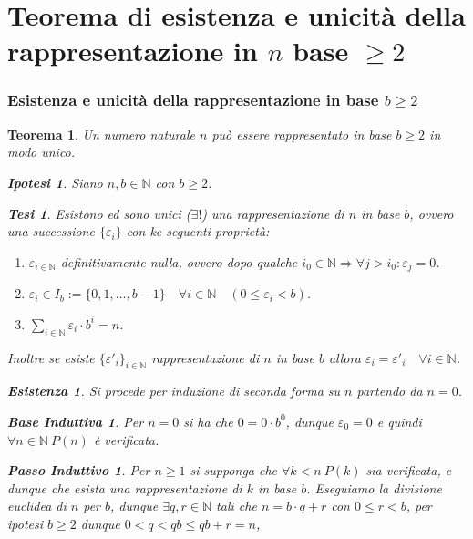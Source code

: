 \documentclass{article}
\makeatletter
\renewenvironment{proof}[1][\proofname]{\par
    \pushQED{\qed}%
    \normalfont \topsep6\p@\@plus6\p@\relax
    \trivlist
    \item\relax
    {\itshape
    #1\@addpunct{.}}\hspace\labelsep\ignorespaces
    }{%
    \popQED\endtrivlist\@endpefalse
}
\newtheorem{theorem}{Teorema}[part]
\newtheorem{ipothesis}[lemma]{Ipotesi}
\newtheorem{thesis}[lemma]{Tesi}
\newtheorem*{existence}{Esistenza}
\newtheorem*{base}{Base Induttiva}
\newtheorem*{step}{Passo Induttivo}
\makeatother
\begin{document}
\part{Teorema di esistenza e unicità della rappresentazione in \(n\) base \(\ge 2\)}
\section{Esistenza e unicità della rappresentazione in base \(b\ge 2\)}
\begin{theorem}
    Un numero naturale \(n\) può essere rappresentato in base \(b\ge 2\) in modo unico.
    \begin{ipothesis}
        Siano \(n,b\in\mathbb{N}\) con \(b\ge 2\).
    \end{ipothesis}
    \begin{thesis}
        Esistono ed sono unici (\(\exists!\)) una rappresentazione di \(n\) in base \(b\), ovvero una successione \(\{\varepsilon_i\}\) con ke seguenti proprietà:
        \begin{enumerate}
            \item \(\varepsilon_{i\in\mathbb{N}}\) definitivamente nulla, ovvero dopo qualche \(i_0\in\mathbb{N}\Rightarrow \forall j>i_0: \varepsilon_j=0\).
            \item \(\varepsilon_i\in I_b:=\{0,1,\ldots,b-1\}\quad \forall i\in\mathbb{N}\quad (0\leq\varepsilon_i< b)\).
            \item \(\displaystyle\sum_{i\in\mathbb{N}} \varepsilon_i\cdot b^i=n\).
        \end{enumerate}
        Inoltre se esiste \(\{\varepsilon'_i\}_{i\in\mathbb{N}}\) rappresentazione di \(n\) in base \(b\) allora \(\varepsilon_i=\varepsilon'_i\quad \forall i\in\mathbb{N}\).
    \end{thesis}
    \begin{proof}
        \begin{existence}
            Si procede per induzione di seconda forma su \(n\) partendo da \(n=0\).
            \begin{base} Per \(n=0\) si ha che \(0=0\cdot b^0\), dunque \(\varepsilon_0=0\) e quindi \(\forall n\in\mathbb{N}\ P(n)\) è verificata.\end{base}
            \begin{step} Per \(n\geq 1\) si supponga che \(\forall k<n\ P(k)\) sia verificata, e dunque che esista una rappresentazione di \(k\) in base \(b\). Eseguiamo la divisione euclidea di \(n\) per \(b\), dunque \(\exists q,r\in\mathbb{N}\) tali che \(n=b\cdot q+r\) con \(0\leq r<b\), per ipotesi \(b\geq 2\) dunque \(0<q<qb\leq qb+r=n\),

\end{step}
\end{existence}
\end{proof}
\end{theorem}
\end{document}
